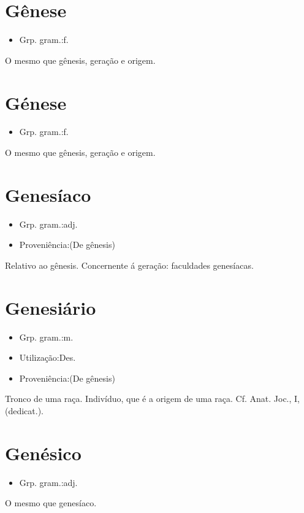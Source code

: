 \section{Gênese}
\begin{itemize}
\item {Grp. gram.:f.}
\end{itemize}
O mesmo que \textunderscore gênesis\textunderscore , geração e origem.
\section{Génese}
\begin{itemize}
\item {Grp. gram.:f.}
\end{itemize}
O mesmo que \textunderscore gênesis\textunderscore , geração e origem.
\section{Genesíaco}
\begin{itemize}
\item {Grp. gram.:adj.}
\end{itemize}
\begin{itemize}
\item {Proveniência:(De \textunderscore gênesis\textunderscore )}
\end{itemize}
Relativo ao gênesis.
Concernente á geração: \textunderscore faculdades genesíacas\textunderscore .
\section{Genesiário}
\begin{itemize}
\item {Grp. gram.:m.}
\end{itemize}
\begin{itemize}
\item {Utilização:Des.}
\end{itemize}
\begin{itemize}
\item {Proveniência:(De \textunderscore gênesis\textunderscore )}
\end{itemize}
Tronco de uma raça.
Indivíduo, que é a origem de uma raça. Cf. \textunderscore Anat. Joc.\textunderscore , I, (dedicat.).
\section{Genésico}
\begin{itemize}
\item {Grp. gram.:adj.}
\end{itemize}
O mesmo que \textunderscore genesíaco\textunderscore .
